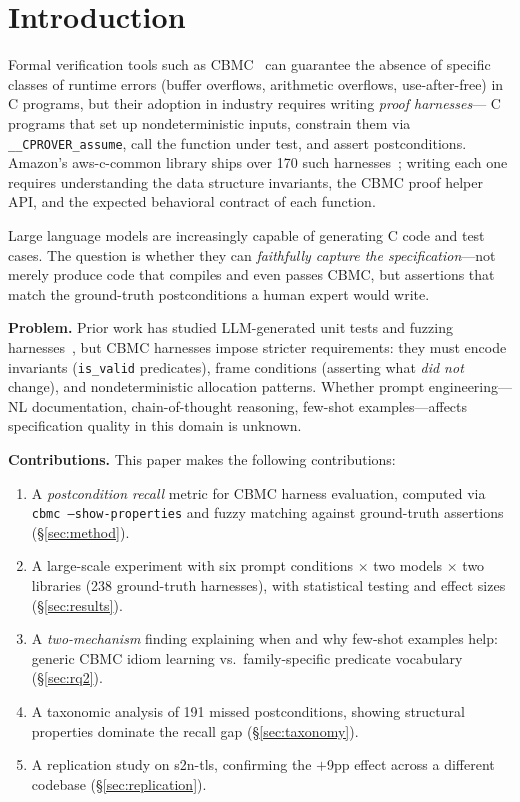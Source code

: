 \documentclass[review]{elsarticle}
\begin{document}
\linenumbers

\section{Introduction}
\label{sec:intro}

Formal verification tools such as CBMC~\cite{cbmc} can guarantee the absence of
specific classes of runtime errors (buffer overflows, arithmetic overflows, use-after-free)
in C programs, but their adoption in industry requires writing \emph{proof harnesses}—
C programs that set up nondeterministic inputs, constrain them via \texttt{\_\_CPROVER\_assume},
call the function under test, and assert postconditions. Amazon's aws-c-common library
ships over 170 such harnesses~\cite{awsc}; writing each one requires understanding the
data structure invariants, the CBMC proof helper API, and the expected behavioral contract
of each function.

Large language models are increasingly capable of generating C code and test cases.
The question is whether they can \emph{faithfully capture the specification}—not merely
produce code that compiles and even passes CBMC, but assertions that match the
ground-truth postconditions a human expert would write.

\textbf{Problem.} Prior work has studied LLM-generated unit tests and fuzzing
harnesses~\cite{chatunitest,fuzzgpt}, but CBMC harnesses impose stricter requirements:
they must encode invariants (\texttt{is\_valid} predicates), frame conditions
(asserting what \emph{did not} change), and nondeterministic allocation patterns.
Whether prompt engineering—NL documentation, chain-of-thought reasoning, few-shot
examples—affects specification quality in this domain is unknown.

\textbf{Contributions.} This paper makes the following contributions:
\begin{enumerate}
  \item A \emph{postcondition recall} metric for CBMC harness evaluation, computed
        via \texttt{cbmc --show-properties} and fuzzy matching against ground-truth
        assertions (\S\ref{sec:method}).
  \item A large-scale experiment with six prompt conditions $\times$ two models
        $\times$ two libraries (238 ground-truth harnesses), with statistical testing
        and effect sizes (\S\ref{sec:results}).
  \item A \emph{two-mechanism} finding explaining when and why few-shot examples
        help: generic CBMC idiom learning vs.\ family-specific predicate vocabulary
        (\S\ref{sec:rq2}).
  \item A taxonomic analysis of 191 missed postconditions, showing structural
        properties dominate the recall gap (\S\ref{sec:taxonomy}).
  \item A replication study on s2n-tls, confirming the $+$9pp effect across a
        different codebase (\S\ref{sec:replication}).
\end{enumerate}
\end{document}
